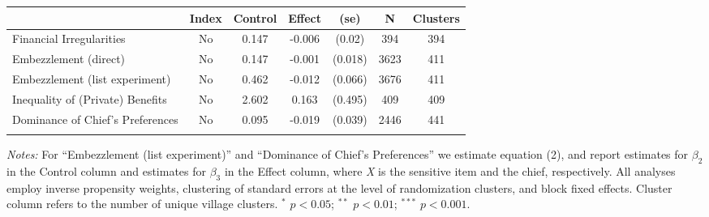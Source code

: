 \begin{tabular}{lcccccc}  
 	& Index &	Control	&	Effect	&	(se)	&	N	& Clusters \\ \hline \hline  
 Financial Irregularities&No&0.147&-0.006&(0.02)&394&394 \\  
 Embezzlement (direct)&No&0.147&-0.001&(0.018)&3623&411 \\  
 Embezzlement (list experiment)&No&0.462&-0.012&(0.066)&3676&411 \\  
 Inequality of (Private) Benefits&No&2.602&0.163&(0.495)&409&409 \\  
 Dominance of Chief's Preferences&No&0.095&-0.019&(0.039)&2446&441 \\  
 \hline \hline  
 \label{table_main}  
 \end{tabular}  
 \begin{flushleft}\textit{Notes:} For ``Embezzlement (list experiment)'' and ``Dominance of Chief's Preferences'' we estimate equation (2), 
  and report estimates for $\beta_2$ in the Control column and estimates for $\beta_3$ in the Effect column, where \textit{X} is the sensitive 
  item and the chief, respectively. All analyses employ inverse propensity weights, clustering of standard errors at the level 
  of randomization clusters, and block fixed effects. Cluster column refers to the number of unique village clusters.
  $^*$ $p<0.05$; $^{**}$ $p<0.01$; $^{***}$ $p<0.001$.\end{flushleft}  
